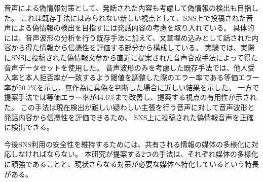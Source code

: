 音声による偽情報対策として、発話された内容も考慮して偽情報の検出も目指した。
これは既存手法にはみられない新しい視点として、SNS上で投稿された音声による偽情報の検出を目指すには発話内容の考慮を取り入れている。
具体的には、音声波形の分析を行う既存手法に加えて、文章埋め込みとして話された内容から得た情報から信憑性を評価する部分から構成している。
実験では、実際にSNSに投稿された偽情報文章から直近に提案された音声合成手法によって得た音声データセットを使用した。
音声波形のみを考慮した既存手法では、他人受入率と本人拒否率が一致するよう閾値を調整した際のエラー率である等価エラー率が50.7\%を示し、無作為に真偽を判断した場合に近しい結果を示した。
一方で提案手法では等価エラー率が44.6\%まで改善し、提案する視点の有用性が示された。
この手法は現在検出が難しい疑わしい主張を行う音声に対して音声波形と発話内容から信憑性を評価できるため、
SNS上に投稿された偽情報音声を正確に検出できる。

今後SNS利用の安全性を維持するためには、共有される情報の媒体の多様化に対応しなければならない。
本研究が提案する2つの手法は、それぞれ媒体の多様化に頑強であることと、現状さらなる対策が必要な媒体へ特化しているという特長がある。
